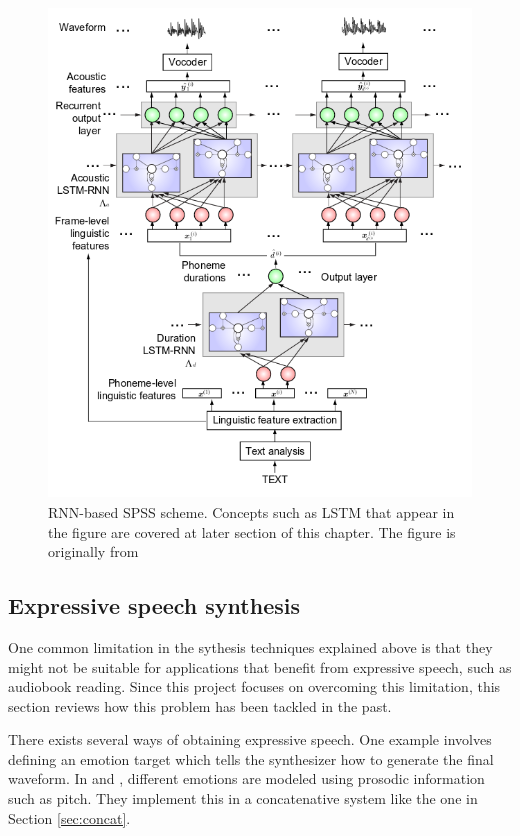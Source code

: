 \begin{figure}
\centering
    \includegraphics[height=13cm]{figures/rnn-tts}
    \caption{RNN-based SPSS scheme. Concepts such as LSTM that appear in the figure are covered at later section of this chapter. The figure is originally from \cite{chen1998rnn}}
    \label{fig:rnn-tts-0}
\end{figure}

\subsection{Expressive speech synthesis}

One common limitation in the sythesis techniques explained above is that they might not be suitable for applications that benefit from expressive speech, such as audiobook reading. Since this project focuses on overcoming this limitation, this section reviews how this problem has been tackled in the past.

There exists several ways of obtaining expressive speech. One example involves defining an emotion target which tells the synthesizer how to generate the final waveform. In \cite{bulut2002expressive} and \cite{eide2004corpus}, different emotions are modeled using prosodic information such as pitch. They implement this in a concatenative system like the one in Section \ref{sec:concat}. 


